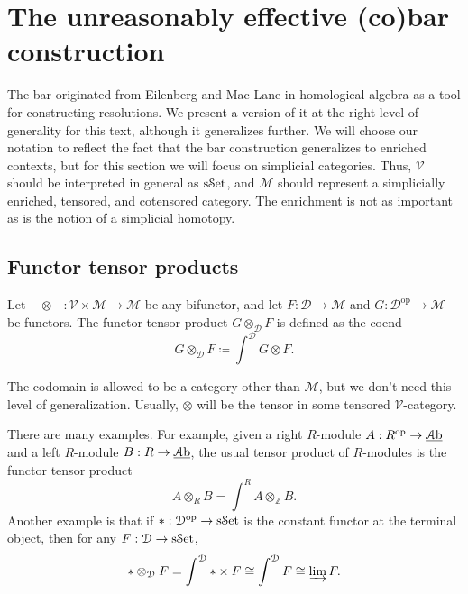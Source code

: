 \chapter{The unreasonably effective (co)bar construction}

The bar originated from Eilenberg and Mac Lane in homological algebra as a tool for constructing resolutions. We present a version of it at the right level of generality for this text, although it generalizes further. We will choose our notation to reflect the fact that the bar construction generalizes to enriched contexts, but for this section we will focus on simplicial categories. Thus, $\mathcal{V} $ should be interpreted in general as $\mathrm{s}\mathcal{S}\mathrm{et}$, and $\mathcal{M} $ should represent a simplicially enriched, tensored, and cotensored category. The enrichment is not as important as is the notion of a simplicial homotopy.

\section{Functor tensor products}

\begin{definition}\label{dfn:4.1}
	Let $-\otimes -: \mathcal{V} \times \mathcal{M}  \to \mathcal{M} $ be any bifunctor, and let $F : \mathcal{D}  \to \mathcal{M} $ and $G : \mathcal{D} ^{\mathrm{op}}  \to \mathcal{M} $ be functors. The functor tensor product $G\otimes _\mathcal{D} F$ is defined as the coend
	\[
		G\otimes _\mathcal{D} F\coloneqq \int^{\mathcal{D} } G\otimes F
	.\]
\end{definition}

The codomain is allowed to be a category other than $\mathcal{M} $, but we don't need this level of generalization. Usually, $\otimes $ will be the tensor in some tensored $\mathcal{V} $-category.

There are many examples. For example, given a right $R$-module $A : R^{\mathrm{op}}  \to \underline{\mathcal{A}\mathrm{b}} $ and a left $R$-module $B : R \to \underline{\mathcal{A}\mathrm{b}} $, the usual tensor product of $R$-modules is the functor tensor product
\[
	A\otimes _RB=\int^{R} A\otimes _\mathbb{Z} B
.\]
Another example is that if $*: \mathcal{D} ^{\mathrm{op}}  \to \mathrm{s}\mathcal{S}\mathrm{et}$ is the constant functor at the terminal object, then for any $F : \mathcal{D}  \to \mathrm{s}\mathcal{S}\mathrm{et}$,
\[
	*\otimes _\mathcal{D} F=\int^{\mathcal{D} } *\times F\cong \int^{\mathcal{D} } F\cong \varinjlim F
.\]

